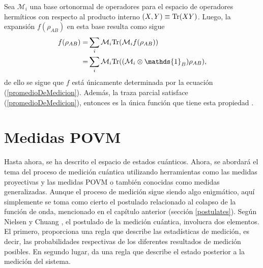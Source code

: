 Sea $\mathcal{M}_i$ una base ortonormal de operadores para el espacio de
operadores hermíticos con respecto al producto interno $(X,Y) \equiv {\rm Tr}(XY)$. Luego, la expansión $f (\rho_{AB} )$ en esta base resulta como sigue
\[\begin{split}
	f(\rho_{AB})=&\sum_{i}\mathcal{M}_i\tr(\mathcal{M}_i f(\rho_{AB}))\\
	=&\sum_{i}\mathcal{M}_i \tr((\mathcal{M}_i\otimes \mathds{1}_B)\rho_{AB}),\\
\end{split}\] 
de ello se sigue que $f$ está únicamente determinada por la ecuación
({\ref{promedioDeMedicion}}). Además, la traza parcial satisface
({\ref{promedioDeMedicion}}), entonces es la única función que tiene esta
propiedad {\cite{nielsen_chuang_2010}}.




















\section{Medidas POVM}\label{MedidaPOVM}
Hasta ahora, se ha descrito el espacio de estados cuánticos. Ahora, se abordará
el tema del proceso de medición cuántica utilizando herramientas como las medidas proyectivas y las medidas POVM o también conocidas como medidas generalizadas. Aunque el proceso de medición  sigue
siendo algo enigmático, aquí simplemente se toma como cierto el
postulado relacionado al colapso de la función de onda, mencionado en el capítulo anterior (sección {\ref{postulates}}). Según Nielsen y Chuang
{\cite{nielsen_chuang_2010}}, el postulado de la medición cuántica, involucra
dos elementos. El primero, proporciona una regla que describe las estadísticas
de medición, es decir, las probabilidades respectivas de los diferentes
resultados de medición posibles. En segundo lugar, da una regla que describe el
estado posterior a la medición del sistema. 

